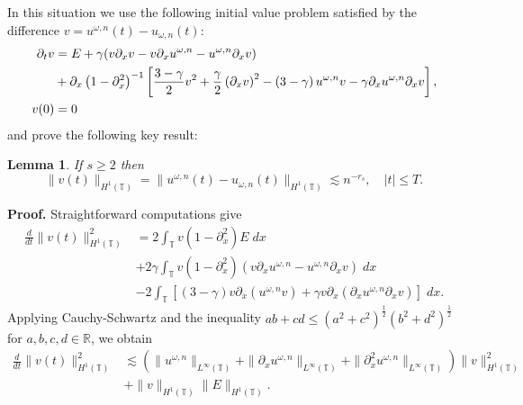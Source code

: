 \documentclass[12pt,reqno]{amsart}
\newcommand{\rr}{\mathbb{R}}
\newcommand{\p}{\partial}
\newcommand{\ci}{\mathbb{T}}
\theoremstyle{plain}  %
\newtheorem{lemma}{Lemma}
\theoremstyle{definition}
\begin{document}
	In this situation we use the following initial value problem
	satisfied  by the difference
	$
	v=
		u^{\omega, n}(t) 
				- 
				u_{\omega, n}(t)
				$:
	\begin{align}
	\label{v-eq}
					\p_t v 
					& = E + \gamma(v \p_x v - v \p_x u^{\omega,n} - u^{\omega,n} \p_x v) 
					\\
					& + \p_x\left( 1 - \p_x^2 \right)^{-1} \left[ \frac{3-
					\gamma}{2}v^2 + \frac{\gamma}{2}\left( \p_x v \right)^2 - \left(
					3 - \gamma \right)u^{\omega,n} v -
					\gamma \p_x u^{\omega,n} \p_x v \right],
					\notag
					\\
					v(0) & =0
					\label{v-data}
			\end{align}
and prove the following key result:
%
\begin{lemma}
	\label{lem:bound_for_difference-of-approx-and-actual-soln}
If $s \ge 2$ then
			\begin{equation} 
				\|
				v(t)
				\|_{H^1(\ci)}
				=
				\label{differ-H1-est} 
				\|
				u^{\omega, n}(t) 
				- 
				u_{\omega, n}(t)
				\|_{H^1(\ci)}
				\lesssim 
				n^{-r_s}, 
				\quad
				|t| \le T.
			\end{equation}
			\end{lemma}
%
			{\bf{Proof.}} 
Straightforward computations give		
\begin{equation}
	\label{energy-estimate-simplified}
	\begin{split}
		\frac{d}{dt} \|v(t)\|_{H^1(\ci)}^2
		& = 2 \int_{\ci}
		 v\left( 1-\p_x^2
	\right)E \; dx
	\\
	&+ 2 \gamma  \int_{\ci}  v\left( 1-\p_x^2 \right)\left( v \p_x u^{\omega,n}
	- u^{\omega,n} \p_x v
	\right) \; dx
	\\
	& - 2 \int_{\ci} \left[ \left( 3-\gamma \right)v \p_x \left( u^{\omega,n}v \right) + \gamma v
	\p_x \left( \p_x u^{\omega,n} \p_x v \right)\right] \; dx.
\end{split}
\end{equation}
Applying Cauchy-Schwartz and the inequality $ab + cd \le (a^2 +
c^2)^{\frac{1}{2}}(b^2 + d^2)^{\frac{1}{2}}$ for $a,b,c,d \in \rr$, we
obtain
\begin{equation}
	\begin{split}
		\label{energy-estimate-best}
		\frac{d}{dt} \|v(t)\|_{H^1(\ci)}^2
		& \lesssim \left( \|u^{\omega,n}\|_{L^\infty(\ci)} + \|
		\p_x u^{\omega,n} \|_{L^\infty(\ci)} + \|\p_x^2 u^{\omega,n} \|_{L^\infty (\ci)} \right)
		\|v\|_{H^1(\ci)}^2 
		\\
		&+ \|v\|_{H^1(\ci)} \|E\|_{H^1(\ci)}.
	\end{split}
\end{equation}
\end{document}
